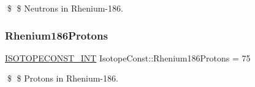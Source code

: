 \$ \$ Neutrons in Rhenium-\/186. \mbox{\label{group___isotope_const-_rhenium-_re186_ga57298cc218700a4dbfe1ee3287759610}} 
\subsubsection{\texorpdfstring{Rhenium186\+Protons}{Rhenium186Protons}}
{\footnotesize\ttfamily \mbox{\hyperlink{group___isotope_const-_macros_ga5f18360b3e99483a35c32d789e62621c}{I\+S\+O\+T\+O\+P\+E\+C\+O\+N\+S\+T\+\_\+\+I\+NT}} Isotope\+Const\+::\+Rhenium186\+Protons = 75}

\$ \$ Protons in Rhenium-\/186. 
